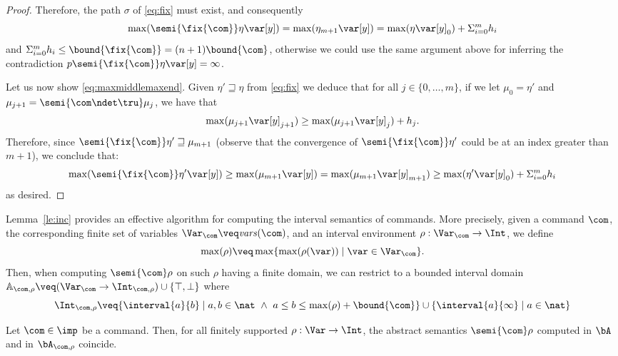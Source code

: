 \begin{proof}
  \noindent
  Therefore, the path \(\sigma\) of \eqref{eq:fix} must exist, and
  consequently
  \[\max(\semi{\fix{\com}} \eta \var[y]) = \max(\eta_{m+1} \var[y]) =
    \max(\eta \var[y]_0) + \Sigma_{i=0}^m h_i\] and
  \(\Sigma_{i=0}^m h_i \leq \bound{\fix{\com}}=(n+1)\bound{\com}\),
  otherwise we could use the same argument above for inferring the
  contradiction \(p\semi{\fix{\com}} \eta \var[y] = \infty\).

  \medskip

  Let us now show \eqref{eq:maxmiddlemaxend}. Given
  \(\eta' \sqsupseteq \eta\) from \eqref{eq:fix} we deduce that for
  all \(j \in \{ 0, \ldots, m\}\), if we let \(\mu_0 = \eta'\) and
  \(\mu_{j+1} = \semi{\com \ndet \tru} \mu_j\), we have that
  \[
    \max(\mu_{j+1} \var[y]_{j+1}) \geq \max(\mu_{j+1} \var[y]_{j}) +
    h_j. \]
  Therefore, since \(\semi{\fix{\com}} \eta' \sqsupseteq \mu_{m+1}\)
  (observe that the convergence of \(\semi{\fix{\com}} \eta' \) could
  be at an index greater than \(m+1\)), we conclude that:
  \[\max(\semi{\fix{\com}} \eta' \var[y]) \geq \max(\mu_{m+1}
  \var[y]) = \max(\mu_{m+1} \var[y]_{m+1}) \geq \max(\eta' \var[y]_0)
  + \Sigma_{i=0}^m h_i\] as desired.
\end{proof}

Lemma~\ref{le:inc} provides an effective algorithm for computing the
interval semantics of commands. More precisely, given a command
\(\com\), the corresponding finite set of variables
\(\Var_{\com} \veq \mathit{vars}(\com)\), and an interval environment
\(\rho : \Var_{\com} \to \Int\), we define
\[\max(\rho) \veq \max \{ \max(\rho(\var)) \mid \var \in \Var_{\com}
  \}.\]
%
Then, when computing \(\semi{\com} \rho\) on such \(\rho\)
having a finite domain, we can restrict to a bounded interval domain
\(\mathbb{A}_{\com,\rho} \veq (\Var_{\com} \to \Int_{\com,\rho}) \cup
\{ \top, \bot \}\) where
\[
  \Int_{\com,\rho} \veq \{ \interval{a}{b} \mid a, b \in \nat\ \land\
  a \leq b \leq \max(\rho) + \bound{\com}\} \cup
  \{\interval{a}{\infty} \mid a \in \nat \}
\]


\begin{lemma}
  Let \(\com\in \imp\) be a command. Then, for all finitely supported
  \(\rho : \Var \to \Int\), the abstract semantics
  \(\semi{\com} \rho \)
  computed in \(\bA\) and in \(\bA_{\com,\rho}\)
  coincide.
\end{lemma}

